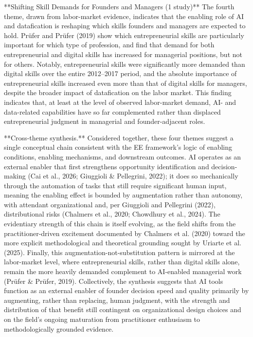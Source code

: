 \documentclass[11pt, a4paper]{article}
\begin{document}
**Shifting Skill Demands for Founders and Managers (1 study)**
The fourth theme, drawn from labor-market evidence, indicates that the enabling role of AI and datafication is reshaping which skills founders and managers are expected to hold. Prüfer and Prüfer (2019) show which entrepreneurial skills are particularly important for which type of profession, and find that demand for both entrepreneurial and digital skills has increased for managerial positions, but not for others. Notably, entrepreneurial skills were significantly more demanded than digital skills over the entire 2012–2017 period, and the absolute importance of entrepreneurial skills increased even more than that of digital skills for managers, despite the broader impact of datafication on the labor market. This finding indicates that, at least at the level of observed labor-market demand, AI- and data-related capabilities have so far complemented rather than displaced entrepreneurial judgment in managerial and founder-adjacent roles.

**Cross-theme synthesis.** Considered together, these four themes suggest a single conceptual chain consistent with the EE framework's logic of enabling conditions, enabling mechanisms, and downstream outcomes. AI operates as an external enabler that first strengthens opportunity identification and decision-making (Cai et al., 2026; Giuggioli & Pellegrini, 2022); it does so mechanically through the automation of tasks that still require significant human input, meaning the enabling effect is bounded by augmentation rather than autonomy, with attendant organizational and, per Giuggioli and Pellegrini (2022), distributional risks (Chalmers et al., 2020; Chowdhury et al., 2024). The evidentiary strength of this chain is itself evolving, as the field shifts from the practitioner-driven excitement documented by Chalmers et al. (2020) toward the more explicit methodological and theoretical grounding sought by Uriarte et al. (2025). Finally, this augmentation-not-substitution pattern is mirrored at the labor-market level, where entrepreneurial skills, rather than digital skills alone, remain the more heavily demanded complement to AI-enabled managerial work (Prüfer & Prüfer, 2019). Collectively, the synthesis suggests that AI tools function as an external enabler of founder decision speed and quality primarily by augmenting, rather than replacing, human judgment, with the strength and distribution of that benefit still contingent on organizational design choices and on the field's ongoing maturation from practitioner enthusiasm to methodologically grounded evidence.
\end{document}
